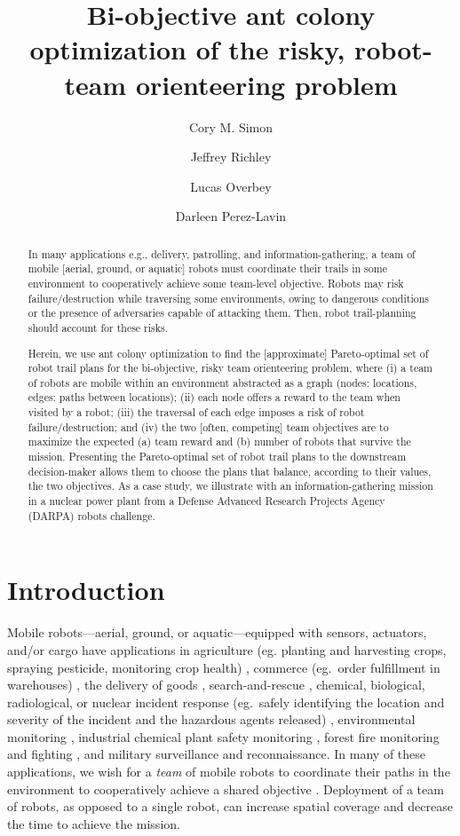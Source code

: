 \documentclass[11pt, oneside]{article}
\title{Bi-objective ant colony optimization of the risky, robot-team orienteering problem}
\author[1]{Cory M. Simon}
\author[2]{Jeffrey Richley}
\author[2]{Lucas Overbey}
\author[2]{Darleen Perez-Lavin}
\affil[1]{School of Chemical, Biological, and Environmental Engineering. Oregon State University. Corvallis, OR. USA.}
\affil[2]{Naval Information Warfare Center Atlantic. Charleston, SC. USA.}
\begin{document}
\maketitle

\begin{abstract}
In many applications e.g., delivery, patrolling, and information-gathering, a team of mobile [aerial, ground, or aquatic] robots must coordinate their trails in some environment to cooperatively achieve some team-level objective. Robots may risk failure/destruction while traversing some environments, owing to dangerous conditions or the presence of adversaries capable of attacking them. Then, robot trail-planning should account for these risks.

Herein, we use ant colony optimization to find the [approximate] Pareto-optimal set of robot trail plans for the bi-objective, risky team orienteering problem, where (i) a team of robots are mobile within an environment abstracted as a graph (nodes: locations, edges: paths between locations); (ii) each node offers a reward to the team when visited by a robot; (iii) the traversal of each edge imposes a risk of robot failure/destruction; and (iv) the two [often, competing] team objectives are to maximize the expected (a) team reward and (b) number of robots that survive the mission. Presenting the Pareto-optimal set of robot trail plans to the downstream decision-maker allows them to choose the plans that balance, according to their values, the two objectives. As a case study, we illustrate with an information-gathering mission in a nuclear power plant from a Defense Advanced Research Projects Agency (DARPA) robots challenge.
\end{abstract}

\clearpage

\section{Introduction}
Mobile robots---aerial, ground, or aquatic---equipped with sensors, actuators, and/or cargo have applications in agriculture (eg.
 planting and harvesting crops, spraying pesticide, monitoring crop health) \cite{santos2020path}, commerce (eg.\ order fulfillment in warehouses) \cite{wurman2008coordinating}, the delivery of goods \cite{coelho2014thirty}, search-and-rescue \cite{queralta2020collaborative}, chemical, biological, radiological, or nuclear incident response (eg.\ safely identifying the location and severity of the incident and the hazardous agents released) \cite{murphy2012projected}, environmental monitoring \cite{dunbabin2012robots}, industrial chemical plant safety monitoring \cite{soldan2014towards}, forest fire monitoring and fighting \cite{merino2012unmanned}, and military surveillance and reconnaissance. 
In many of these applications, we wish for a \emph{team} of mobile robots to coordinate their paths in the environment to cooperatively achieve a shared objective \cite{parker2007distributed,lesser1999cooperative}.
Deployment of a team of robots, as opposed to a single robot, can increase spatial coverage and decrease the time to achieve the mission. 
\end{document}
